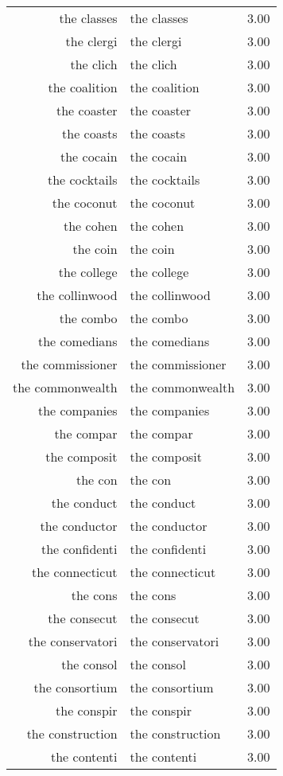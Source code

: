 \begin{table}[ht]
\begin{tabular}{rlr}
  the classes & the classes & 3.00 \\ 
  the clergi & the clergi & 3.00 \\ 
  the clich & the clich & 3.00 \\ 
  the coalition & the coalition & 3.00 \\ 
  the coaster & the coaster & 3.00 \\ 
  the coasts & the coasts & 3.00 \\ 
  the cocain & the cocain & 3.00 \\ 
  the cocktails & the cocktails & 3.00 \\ 
  the coconut & the coconut & 3.00 \\ 
  the cohen & the cohen & 3.00 \\ 
  the coin & the coin & 3.00 \\ 
  the college & the college & 3.00 \\ 
  the collinwood & the collinwood & 3.00 \\ 
  the combo & the combo & 3.00 \\ 
  the comedians & the comedians & 3.00 \\ 
  the commissioner & the commissioner & 3.00 \\ 
  the commonwealth & the commonwealth & 3.00 \\ 
  the companies & the companies & 3.00 \\ 
  the compar & the compar & 3.00 \\ 
  the composit & the composit & 3.00 \\ 
  the con & the con & 3.00 \\ 
  the conduct & the conduct & 3.00 \\ 
  the conductor & the conductor & 3.00 \\ 
  the confidenti & the confidenti & 3.00 \\ 
  the connecticut & the connecticut & 3.00 \\ 
  the cons & the cons & 3.00 \\ 
  the consecut & the consecut & 3.00 \\ 
  the conservatori & the conservatori & 3.00 \\ 
  the consol & the consol & 3.00 \\ 
  the consortium & the consortium & 3.00 \\ 
  the conspir & the conspir & 3.00 \\ 
  the construction & the construction & 3.00 \\ 
  the contenti & the contenti & 3.00 \\ 

\end{tabular}
\end{table}
